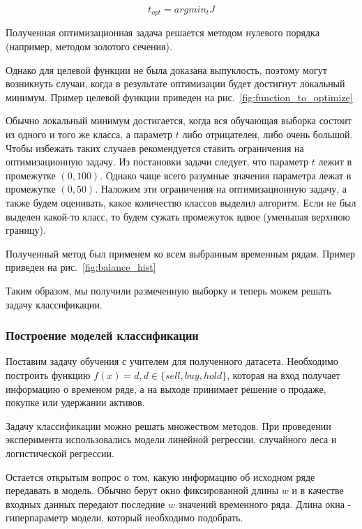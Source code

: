\documentclass[a4paper,article,14pt]{extarticle}
\begin{document}
\begin{equation}
    t_{opt} = argmin_t J
    \label{eq:equation4}
\end{equation}

Полученная оптимизационная задача решается методом нулевого порядка (например, методом золотого сечения).

Однако для целевой функции не была доказана выпуклость, поэтому могут возникнуть случаи, когда в результате оптимизации будет достигнут локальный минимум.
Пример целевой функции приведен на рис.~\ref{fig:function_to_optimize}



Обычно локальный минимум достигается, когда вся обучающая выборка состоит из одного и того же класса, а параметр $t$ либо отрицателен, либо очень большой.
Чтобы избежать таких случаев рекомендуется ставить ограничения на оптимизационную задачу.
Из постановки задачи следует, что параметр $t$ лежит в промежутке $(0, 100)$.
Однако чаще всего разумные значения параметра лежат в промежутке $(0, 50)$.
Наложим эти ограничения на оптимизационную задачу, а также будем оценивать, какое количество классов выделил алгоритм.
Если не был выделен какой-то класс, то будем сужать промежуток вдвое (уменьшая верхнюю границу).

\par
Полученный метод был применем ко всем выбранным временным рядам.
Пример приведен на рис.~\ref{fig:balance_hist}



Таким образом, мы получили размеченную выборку и теперь можем решать задачу классификации.

\subsubsection{Построение моделей классификации}

Поставим задачу обучения с учителем для полученного датасета.
Необходимо построить функцию $f(x)=d, d \in \{sell, buy, hold\}$, которая на вход получает информацию о временом ряде, а на выходе принимает решение о продаже, покупке или удержании активов.

Задачу классификации можно решать множеством методов.
При проведении эксперимента использовались модели линейной регрессии, случайного леса и логистической регрессии.

Остается открытым вопрос о том, какую информацию об исходном ряде передавать в модель.
Обычно берут окно фиксированной длины $w$ и в качестве входных данных передают последние $w$ значений временного ряда.
Длина окна - гиперпараметр модели, который необходимо подобрать.
\end{document}
